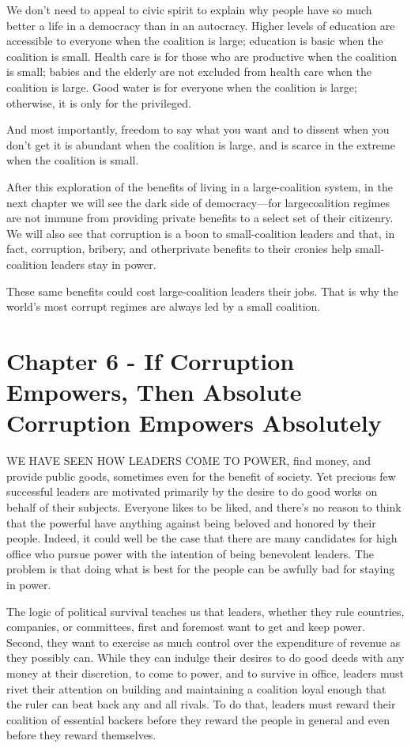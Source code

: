 \documentclass[10pt]{article}
\begin{document}
{\large We don't need to appeal to civic spirit to explain why people have so
much better a life in a democracy than in an autocracy. Higher levels of
education are accessible to everyone when the coalition is large; education is
basic when the coalition is small. Health care is for those who are productive
when the coalition is small; babies and the elderly are not excluded from health
care when the coalition is large. Good water is for everyone when the coalition
is large; otherwise, it is only for the privileged.}

{\large And most importantly, freedom to say what you want and to dissent when
you don't get it is abundant when the coalition is large, and is scarce in the
extreme when the coalition is small.}

{\large After this exploration of the benefits of living in a large-coalition
system, in the next chapter we will see the dark side of democracy---for
largecoalition regimes are not immune from providing private benefits to a select
set of their citizenry. We will also see that corruption is a boon to
small-coalition leaders and that, in fact, corruption, bribery, and otherprivate
benefits to their cronies help small-coalition leaders stay in power.}

{\large These same benefits could cost large-coalition leaders their jobs. That
is why the world's most corrupt regimes are always led by a small coalition.}
\pagebreak{}


\section{Chapter 6 - If Corruption Empowers, Then Absolute Corruption Empowers
Absolutely}

{\large WE HAVE SEEN HOW LEADERS COME TO POWER, find money, and provide public
goods, sometimes even for the benefit of society. Yet precious few successful
leaders are motivated primarily by the desire to do good works on behalf of their
subjects. Everyone likes to be liked, and there's no reason to think that the
powerful have anything against being beloved and honored by their people. Indeed,
it could well be the case that there are many candidates for high office who
pursue power with the intention of being benevolent leaders. The problem is that
doing what is best for the people can be awfully bad for staying in power.}

{\large The logic of political survival teaches us that leaders, whether they
rule countries, companies, or committees, first and foremost want to get and keep
power. Second, they want to exercise as much control over the expenditure of
revenue as they possibly can. While they can indulge their desires to do good
deeds with any money at their discretion, to come to power, and to survive in
office, leaders must rivet their attention on building and maintaining a
coalition loyal enough that the ruler can beat back any and all rivals. To do
that, leaders must reward their coalition of essential backers before they reward
the people in general and even before they reward themselves.}
\end{document}
